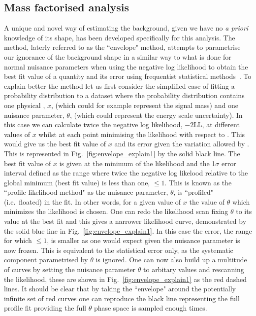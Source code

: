 \subsection{Mass factorised analysis}
\label{sec:envelope}

A unique and novel way of estimating the background, given we have no \emph{a priori} knowledge of its shape, has been developed specifically for this analysis. The method, laterly referred to as the ``envelope" method, attempts to parametrise our ignorance of the background shape in a similar way to what is done for normal nuisance parameters when using the negative log likelihood to obtain the best fit value of a quantity and its error using frequentist statistical methods~\cite{FredJames}. To explain better the method let us first consider the simplified case of fitting a probability distribution to a dataset where the probability distribution contains one physical \POI, $x$, (which could for example represent the signal mass) and one nuisance parameter, $\theta$, (which could represent the energy scale uncertainty). In this case we can calculate twice the negative log likelihood, $-2$LL, at different values of $x$ whilst at each point minimising the likelihood with respect to \theta. 
This would give us the best fit value of $x$ and its error given the variation allowed by \theta. This is represented in Fig.~\ref{fig:envelope_explain1} by the solid black line. The best fit value of $x$ is given at the minimum of the likelihood and the 1$\sigma$ error interval defined as the range where twice the negative log likelood relative to the global minimum (best fit value) is less than one, \NLL$\leq1$. This is known as the ``profile likelihood method" as the nuisance parameter, $\theta$, is ``profiled" (i.e.\ floated) in the fit. In other words, for a given value of $x$ the value of $\theta$ which minimizes the likelihood is chosen. One can redo the likelihood scan fixing $\theta$ to its value at the best fit and this gives a narrower likelihood curve, demonstrated by the solid blue line in Fig.~\ref{fig:envelope_explain1}. In this case the error, the range for which \NLL$\leq1$, is smaller as one would expect given the nuisance parameter is now frozen. This is equivalent to the statistical error only, as the systematic component parametrised by $\theta$ is ignored. One can now also build up a multitude of curves by setting the nuisance parameter $\theta$ to arbitary values and rescanning the likelihood, these are shown in Fig.~\ref{fig:envelope_explain1} as the red dashed lines. It should be clear that by taking the ``envelope" around the potentially infinite set of red curves one can reproduce the black line representing the full profile fit providing the full $\theta$ phase space is sampled enough times. 

